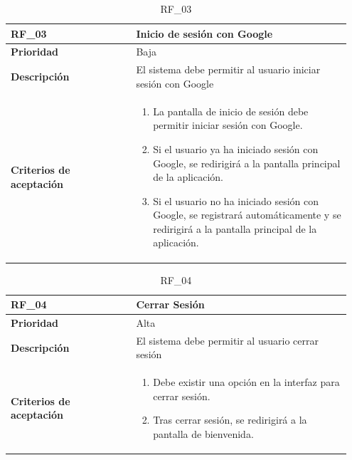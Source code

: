 \begin{table}[htb!]
    \begin{tabular}{|p{0.35\linewidth}|p{0.6\linewidth}|}
        \hline
        \rowcolor[HTML]{C0C0C0}  
        \textbf{RF\_03} & \textbf{Inicio de sesión con Google} \\
        \hline
        \textbf{Prioridad} & Baja \\
        \hline
        \textbf{Descripción} & El sistema debe permitir al usuario iniciar sesión con Google  \\
        \hline
        \vspace{0.5mm}
        \textbf{Criterios de aceptación} & 
        \begin{minipage}[t]{0.9\linewidth}
            \begin{enumerate}
                \item La pantalla de inicio de sesión debe permitir iniciar sesión con Google.
                \item Si el usuario ya ha iniciado sesión con Google, se redirigirá a la pantalla principal de la aplicación.
                \item Si el usuario no ha iniciado sesión con Google, se registrará automáticamente y se redirigirá a la pantalla principal de la aplicación.
            \end{enumerate}
            \vspace{2mm}
        \end{minipage} \\
        \hline
    \end{tabular}
    \label{req:RF03}
    \caption{RF\_03}
\end{table}

\begin{table} [htb!]
    \begin{tabular}{|p{0.35\linewidth}|p{0.6\linewidth}|}
        \hline
        \rowcolor[HTML]{C0C0C0}  
        \textbf{RF\_04} & \textbf{Cerrar Sesión} \\
        \hline
        \textbf{Prioridad} & Alta \\
        \hline
        \textbf{Descripción} & El sistema debe permitir al usuario cerrar sesión  \\
        \hline
        \vspace{0.5mm}
        \textbf{Criterios de aceptación} & 
        \begin{minipage}[t]{0.9\linewidth}
            \begin{enumerate}
                \item Debe existir una opción en la interfaz para cerrar sesión.
                \item Tras cerrar sesión, se redirigirá a la pantalla de bienvenida.
            \end{enumerate}
            \vspace{2mm}
        \end{minipage} \\
        \hline
    \end{tabular}
    \caption{RF\_04}
    \label{req:RF04}

\end{table}


